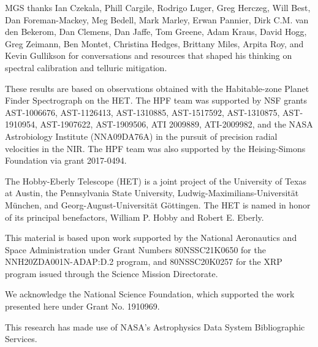 \documentclass[trackchanges]{aastex631}
\begin{document}
\begin{acknowledgments}

    MGS thanks Ian Czekala, Phill Cargile, Rodrigo Luger, Greg Herczeg, Will Best, Dan Foreman-Mackey, Meg Bedell, Mark Marley, Erwan Pannier, Dirk C.M. van den Bekerom, Dan Clemens, Dan Jaffe, Tom Greene, Adam Kraus, David Hogg, Greg Zeimann, Ben Montet, Christina Hedges, Brittany Miles, Arpita Roy, and Kevin Gullikson for conversations and resources that shaped his thinking on spectral calibration and telluric mitigation.

    These results are based on observations obtained with the Habitable-zone Planet Finder Spectrograph on the HET. The HPF team was supported by NSF grants AST-1006676, AST-1126413, AST-1310885, AST-1517592, AST-1310875, AST-1910954, AST-1907622, AST-1909506, ATI 2009889, ATI-2009982, and the NASA Astrobiology Institute (NNA09DA76A) in the pursuit of precision radial velocities in the NIR. The HPF team was also supported by the Heising-Simons Foundation via grant 2017-0494.

    The Hobby-Eberly Telescope (HET) is a joint project of the University of Texas at Austin, the Pennsylvania State University, Ludwig-Maximilians-Universit\"at M\"unchen, and Georg-August-Universit\"at G\"ottingen. The HET is named in honor of its principal benefactors, William P. Hobby and Robert E. Eberly.

    This material is based upon work supported by the National Aeronautics and Space Administration under Grant Numbers 80NSSC21K0650 for the NNH20ZDA001N-ADAP:D.2 program,
    and 80NSSC20K0257 for the XRP program issued through the Science Mission Directorate.

    We acknowledge the National Science Foundation, which supported the work presented here under Grant No. 1910969.

    This research has made use of NASA's Astrophysics Data System Bibliographic Services.

\end{acknowledgments}



\end{document}
